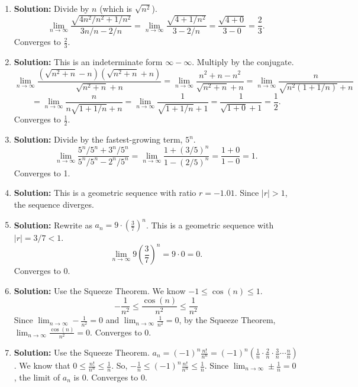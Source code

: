 \documentclass{article}
\begin{document}
\begin{enumerate}
    \item \textbf{Solution:} Divide by $n$ (which is $\sqrt{n^2}$).
    \[ \lim_{n \to \infty} \frac{\sqrt{4n^2/n^2 + 1/n^2}}{3n/n - 2/n} = \lim_{n \to \infty} \frac{\sqrt{4 + 1/n^2}}{3 - 2/n} = \frac{\sqrt{4+0}}{3-0} = \frac{2}{3}. \]
    Converges to $\frac{2}{3}$.

    \item \textbf{Solution:} This is an indeterminate form $\infty - \infty$. Multiply by the conjugate.
    \[ \lim_{n \to \infty} \frac{(\sqrt{n^2 + n} - n)(\sqrt{n^2 + n} + n)}{\sqrt{n^2 + n} + n} = \lim_{n \to \infty} \frac{n^2 + n - n^2}{\sqrt{n^2 + n} + n} = \lim_{n \to \infty} \frac{n}{\sqrt{n^2(1 + 1/n)} + n} \]
    \[ = \lim_{n \to \infty} \frac{n}{n\sqrt{1 + 1/n} + n} = \lim_{n \to \infty} \frac{1}{\sqrt{1 + 1/n} + 1} = \frac{1}{\sqrt{1+0}+1} = \frac{1}{2}. \]
    Converges to $\frac{1}{2}$.

    \item \textbf{Solution:} Divide by the fastest-growing term, $5^n$.
    \[ \lim_{n \to \infty} \frac{5^n/5^n + 3^n/5^n}{5^n/5^n - 2^n/5^n} = \lim_{n \to \infty} \frac{1 + (3/5)^n}{1 - (2/5)^n} = \frac{1+0}{1-0} = 1. \]
    Converges to 1.

    \item \textbf{Solution:} This is a geometric sequence with ratio $r = -1.01$. Since $|r| > 1$, the sequence diverges.

    \item \textbf{Solution:} Rewrite as $a_n = 9 \cdot \left(\frac{3}{7}\right)^n$. This is a geometric sequence with $|r| = 3/7 < 1$.
    \[ \lim_{n \to \infty} 9 \left(\frac{3}{7}\right)^n = 9 \cdot 0 = 0. \]
    Converges to 0.

    \item \textbf{Solution:} Use the Squeeze Theorem. We know $-1 \le \cos(n) \le 1$.
    \[ -\frac{1}{n^2} \le \frac{\cos(n)}{n^2} \le \frac{1}{n^2} \]
    Since $\lim_{n \to \infty} -\frac{1}{n^2} = 0$ and $\lim_{n \to \infty} \frac{1}{n^2} = 0$, by the Squeeze Theorem, $\lim_{n \to \infty} \frac{\cos(n)}{n^2} = 0$. Converges to 0.

    \item \textbf{Solution:} Use the Squeeze Theorem.
    $a_n = (-1)^n \frac{n!}{n^n} = (-1)^n \left(\frac{1}{n} \cdot \frac{2}{n} \cdot \frac{3}{n} \cdots \frac{n}{n}\right)$.
    We know that $0 \le \frac{n!}{n^n} \le \frac{1}{n}$.
    So, $-\frac{1}{n} \le (-1)^n \frac{n!}{n^n} \le \frac{1}{n}$.
    Since $\lim_{n \to \infty} \pm \frac{1}{n} = 0$, the limit of $a_n$ is 0. Converges to 0.


\end{enumerate}
\end{document}
